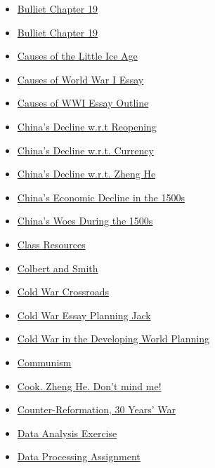 \documentclass[11pt]{article}
\begin{document}
\begin{itemize}
\begin{itemize}
\begin{itemize}
\item \href{history/history10/KBBullietCh19.org}{Bulliet Chapter 19}
\item \href{history/history10/KBhHIST201BullietCh19.org}{Bulliet Chapter 19}
\item \href{history/history10/KBhHIST201TheoriesOfLittleIceAge.org}{Causes of the Little Ice Age}
\item \href{history/history10/KBe21hist201retCausesOfWWIEssay.org}{Causes of World War I Essay}
\item \href{history/history10/KBe21hist201floCausesOfWWIEssayOutline.org}{Causes of WWI Essay Outline}
\item \href{history/history10/KBhHIST201ChinasDeclineWRTReopening.org}{China's Decline w.r.t Reopening}
\item \href{history/history10/KBhHIST201ChinasDeclineWRTCurrency.org}{China's Decline w.r.t. Currency}
\item \href{history/history10/KBhHIST201ChinasDeclineWRTZhengHe.org}{China's Decline w.r.t. Zheng He}
\item \href{history/history10/KBhHIST201ChinasDecline1500.org}{China's Economic Decline in the 1500s}
\item \href{history/history10/KBhHIST201ChinaWoes1500.org}{China's Woes During the 1500s}
\item \href{history/history10/KBe2020hist201refClassResources.org}{Class Resources}
\item \href{history/history10/KBhHIST201ColbertAndSmith.org}{Colbert and Smith}
\item \href{history/history10/KBhHIST201ColdWarCrossroads.org}{Cold War Crossroads}
\item \href{history/history10/KBhHIST201ColdWarEssayPlanningJack.org}{Cold War Essay Planning Jack}
\item \href{history/history10/KBxColdWarDevelopingWorldPlanning.org}{Cold War in the Developing World Planning}
\item \href{history/history10/KBhHIST201Communism.org}{Communism}
\item \href{history/history10/KBhHIST201CookZhengHe.org}{Cook. Zheng He. Don't mind me!}
\item \href{history/history10/KBhHIST201CounterReformation.org}{Counter-Reformation, 30 Years' War}
\item \href{history/history10/KBxDataAnalysisExercise.org}{Data Analysis Exercise}
\item \href{history/history10/KBDataProcessingRett.org}{Data Processing Assignment}

\end{itemize}
\end{itemize}
\end{itemize}
\end{document}
